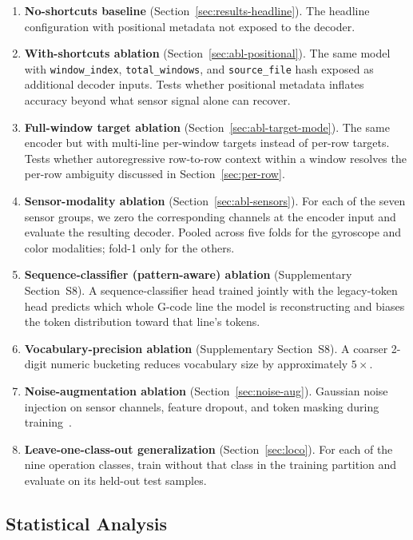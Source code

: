 \documentclass[sensors,article,submit,moreauthors,pdftex]{Definitions/mdpi}
\begin{document}
\begin{enumerate}
\item \textbf{No-shortcuts baseline} (Section~\ref{sec:results-headline}). The headline configuration with positional metadata not exposed to the decoder.
\item \textbf{With-shortcuts ablation} (Section~\ref{sec:abl-positional}). The same model with \texttt{window\_index}, \texttt{total\_windows}, and \texttt{source\_file} hash exposed as additional decoder inputs. Tests whether positional metadata inflates accuracy beyond what sensor signal alone can recover.
\item \textbf{Full-window target ablation} (Section~\ref{sec:abl-target-mode}). The same encoder but with multi-line per-window targets instead of per-row targets. Tests whether autoregressive row-to-row context within a window resolves the per-row ambiguity discussed in Section~\ref{sec:per-row}.
\item \textbf{Sensor-modality ablation} (Section~\ref{sec:abl-sensors}). For each of the seven sensor groups, we zero the corresponding channels at the encoder input and evaluate the resulting decoder. Pooled across five folds for the gyroscope and color modalities; fold-1 only for the others.
\item \textbf{Sequence-classifier (pattern-aware) ablation} (Supplementary Section~S8). A sequence-classifier head trained jointly with the legacy-token head predicts which whole G-code line the model is reconstructing and biases the token distribution toward that line's tokens.
\item \textbf{Vocabulary-precision ablation} (Supplementary Section~S8). A coarser 2-digit numeric bucketing reduces vocabulary size by approximately $5\times$.
\item \textbf{Noise-augmentation ablation} (Section~\ref{sec:noise-aug}). Gaussian noise injection on sensor channels, feature dropout, and token masking during training~\cite{srivastava2014dropout,jia2016deep,meyes2019ablation}.
\item \textbf{Leave-one-class-out generalization} (Section~\ref{sec:loco}). For each of the nine operation classes, train without that class in the training partition and evaluate on its held-out test samples.
\end{enumerate}

\subsection{Statistical Analysis}
\label{sec:stats}
\end{document}
